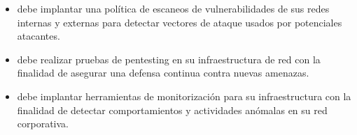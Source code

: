 \begin{enumerate}[label=\alph*)]
    \begin{itemize}
        \item \Beneficiario{} debe implantar una política de escaneos de vulnerabilidades de sus redes internas y externas para detectar vectores de ataque usados por potenciales atacantes.
        \item \Beneficiario{} debe realizar pruebas de pentesting en su infraestructura de red con la finalidad de asegurar una defensa continua contra nuevas amenazas.
        \item \Beneficiario{} debe implantar herramientas de monitorización para su infraestructura con la finalidad de detectar comportamientos y actividades anómalas en su red corporativa.
    \end{itemize}

\end{enumerate}